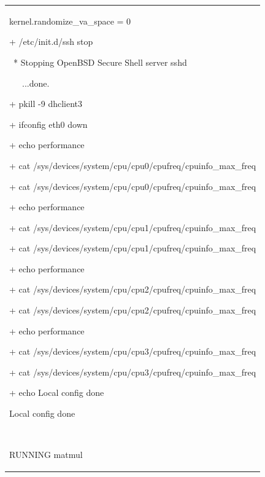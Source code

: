 \documentclass[a4paper]{article}
\begin{document}
\begin{flushleft}
\tablehead{}
\begin{tiny}
\begin{supertabular}{|m{6.34626in}|}
\hline
{\ttfamily
kernel.randomize\_va\_space = 0}

{\ttfamily + /etc/init.d/ssh stop}

{\ttfamily \ * Stopping OpenBSD
Secure Shell server sshd}

{\ttfamily \ \ \ ...done.}

{\ttfamily + pkill -9 dhclient3}

{\ttfamily + ifconfig eth0 down}

{\ttfamily + echo performance}

{\ttfamily + cat
/sys/devices/system/cpu/cpu0/cpufreq/cpuinfo\_max\_freq}

{\ttfamily + cat
/sys/devices/system/cpu/cpu0/cpufreq/cpuinfo\_max\_freq}

{\ttfamily + echo performance}

{\ttfamily + cat
/sys/devices/system/cpu/cpu1/cpufreq/cpuinfo\_max\_freq}

{\ttfamily + cat
/sys/devices/system/cpu/cpu1/cpufreq/cpuinfo\_max\_freq}

{\ttfamily + echo performance}

{\ttfamily + cat
/sys/devices/system/cpu/cpu2/cpufreq/cpuinfo\_max\_freq}

{\ttfamily + cat
/sys/devices/system/cpu/cpu2/cpufreq/cpuinfo\_max\_freq}

{\ttfamily + echo performance}

{\ttfamily + cat
/sys/devices/system/cpu/cpu3/cpufreq/cpuinfo\_max\_freq}

{\ttfamily + cat
/sys/devices/system/cpu/cpu3/cpufreq/cpuinfo\_max\_freq}

{\ttfamily + echo Local config
done}

{\ttfamily Local config done}

~

{\ttfamily RUNNING matmul}


\end{supertabular}
\end{tiny}
\end{flushleft}
\end{document}
